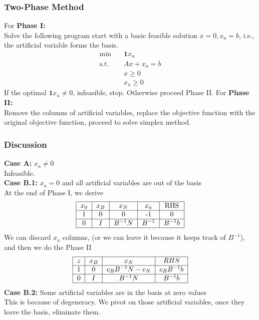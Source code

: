 					\subsubsection{Two-Phase Method}
						For \textbf{Phase I:}\\
							Solve the following program start with a basic feasible solution $x=0, x_a=b$, i.e., the artificial variable forms the basis.
							\begin{align}
								\min \quad & \mathbf{1}x_a \\
								\text{s.t.} \quad & Ax + x_a = b \\
												  & x \ge 0 \\
												  & x_a \ge 0 
							\end{align}
							If the optimal $\mathbf{1}x_a \ne 0$, infeasible, stop. Otherwise proceed Phase II.
						For \textbf{Phase II:}\\
							Remove the columns of artificial variables, replace the objective function with the original objective function, proceed to solve simplex method.
					\subsubsection{Discussion}
						\textbf{Case A:} $x_a \ne 0$\\
							Infeasible.\\
						\textbf{Case B.1:} $x_a = 0$ and all artificial variables are out of the basis\\
						At the end of Phase I, we derive
						\begin{align}
							\begin{tabular} {|c|c|c|c|c|}
								\hline
								$x_0$ & $x_B$ & $x_N$ & $x_a$ & RHS \\
								\hline
								1 & 0 & 0 & -1 & 0\\
								\hline
								0 & $I$ & $B^{-1}N$ & $B^{-1}$ & $B^{-1}b$ \\
								\hline
							\end{tabular} 
						\end{align}
						We can discard $x_a$ columns, (or we can leave it because it keeps track of $B^{-1}$), and then we do the Phase II
						\begin{align}
							\begin{tabular} {|c|c|c|c|}
								\hline
								$z$ & $x_B$ & $x_N$ & $RHS$ \\
								\hline
								1 & 0 & $c_BB^{-1}N - c_N$ & $c_BB^{-1}b$ \\
								\hline
								0 & $I$ & $B^{-1}N$ & $B^{-1}b$ \\
								\hline
							\end{tabular} 
						\end{align}
						\textbf{Case B.2:} Some artificial variables are in the basis at zero values\\
						This is because of degeneracy. We pivot on those artificial variables, once they leave the basis, eliminate them.
